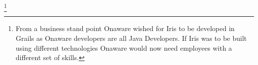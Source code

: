 \footnote{From a business stand point Onaware wished for Iris to be developed in Grails as Onaware developers are all Java Developers. 
If Iris was to be built using different technologies Onaware would now need employees with a different set of skills.}